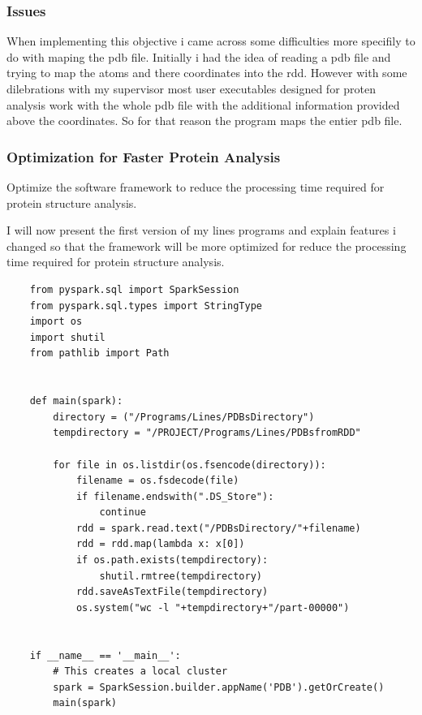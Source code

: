 \documentclass[]{final_report}
\begin{document}
\subsubsection{Issues}
When implementing this objective i came across some difficulties more specifily to do with maping the pdb file. Initially i had the idea of reading a pdb file and trying to map the atoms and there coordinates into the rdd. However with some dilebrations with my supervisor most user executables designed for proten analysis work with the whole pdb file with the additional information provided above the coordinates. So for that reason the program maps the entier pdb file.

\clearpage

\subsubsection{Optimization for Faster Protein Analysis}

\begin{displayquote}
    Optimize the software framework to reduce the processing time required for protein structure analysis.
\end{displayquote}

I will now present the first version of my lines programs and explain features i changed so that the framework will be more optimized for reduce the processing time required for protein structure analysis.

\begin{lstlisting}
    from pyspark.sql import SparkSession
    from pyspark.sql.types import StringType
    import os
    import shutil
    from pathlib import Path


    def main(spark):
        directory = ("/Programs/Lines/PDBsDirectory")
        tempdirectory = "/PROJECT/Programs/Lines/PDBsfromRDD"

        for file in os.listdir(os.fsencode(directory)):
            filename = os.fsdecode(file)
            if filename.endswith(".DS_Store"):
                continue
            rdd = spark.read.text("/PDBsDirectory/"+filename)
            rdd = rdd.map(lambda x: x[0])
            if os.path.exists(tempdirectory):
                shutil.rmtree(tempdirectory)
            rdd.saveAsTextFile(tempdirectory)
            os.system("wc -l "+tempdirectory+"/part-00000")


    if __name__ == '__main__':
        # This creates a local cluster
        spark = SparkSession.builder.appName('PDB').getOrCreate()
        main(spark)
\end{lstlisting}
\end{document}
